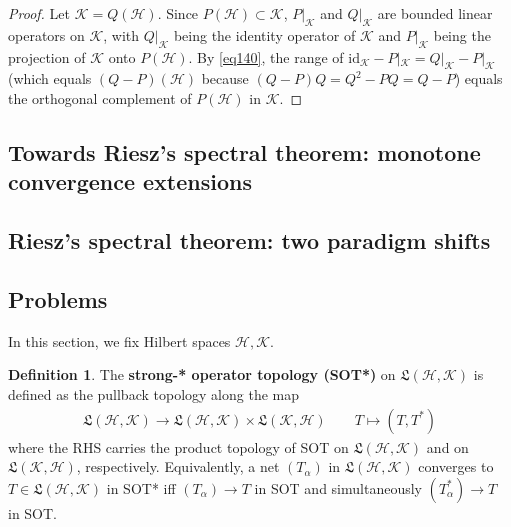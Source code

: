 \documentclass[12pt,b5paper,notitlepage]{article}
\theoremstyle{definition}
\newtheorem{df}{Definition}[subsection]
\theoremstyle{plain}
\newcommand{\fk}{\mathfrak}
\newcommand{\mc}{\mathcal}
\newcommand{\id}{\mathrm{id}}
\newcommand{\MH}{\mathcal H}
\newcommand{\MK}{\mathcal K}
\numberwithin{equation}{section}
\begin{document}
\begin{proof}
Let $\mc K=Q(\MH)$. Since $P(\MH)\subset\MK$, $P|_\MK$ and $Q|_\MK$ are bounded linear operators on $\MK$, with $Q|_\MK$ being the identity operator of $\MK$ and $P|_\MK$ being the projection of $\MK$ onto $P(\MH)$. By \eqref{eq140}, the range of $\id_\MK-P|_\MK=Q|_\MK-P|_\MK$ (which equals $(Q-P)(\MH)$ because $(Q-P)Q=Q^2-PQ=Q-P$) equals the orthogonal complement of $P(\MH)$ in $\MK$.
\end{proof}





\subsection{Towards Riesz's spectral theorem: monotone convergence extensions}














\hypertarget{current}{}



\subsection{Riesz's spectral theorem: two paradigm shifts}\label{lb245}












\subsection{Problems}

In this section, we fix Hilbert spaces $\MH,\MK$.

\begin{df}
The \textbf{strong-* operator topology (SOT*)}   on $\fk L(\MH,\MK)$ is defined as the pullback topology along the map
\begin{align*}
\fk L(\MH,\MK)\rightarrow\fk L(\MH,\MK)\times\fk L(\MK,\MH)\qquad T\mapsto (T,T^*)
\end{align*}
where the RHS carries the product topology of SOT on $\fk L(\MH,\MK)$ and on $\fk L(\MK,\MH)$, respectively. Equivalently, a net $(T_\alpha)$ in $\fk L(\MH,\MK)$ converges to $T\in\fk L(\MH,\MK)$ in SOT* iff $(T_\alpha)\rightarrow T$ in SOT and simultaneously $(T_\alpha^*)\rightarrow T$ in SOT.
\end{df}
\end{document}
